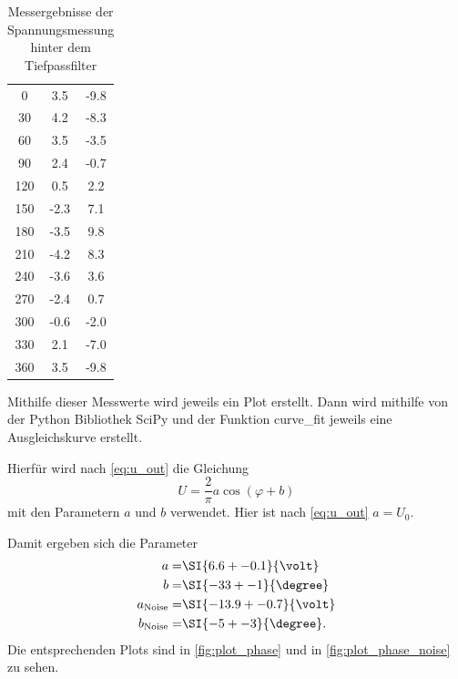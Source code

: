 \begin{table}
    \centering
    \begin{tabular}{S[table-format=3.0] S[table-format=-1.1] S[table-format=-1.1]}
        \toprule
        \tableSI{\varphi}{\degree} &  &  \\
         & 3.5 & -9.8 \\
        30 & 4.2 & -8.3 \\
        60 & 3.5 & -3.5 \\
        90 & 2.4 & -0.7 \\
        120 & 0.5 & 2.2 \\
        150 & -2.3 & 7.1 \\
        180 & -3.5 & 9.8 \\
        210 & -4.2 & 8.3 \\
        240 & -3.6 & 3.6 \\
        270 & -2.4 & 0.7 \\
        300 & -0.6 & -2.0 \\
        330 & 2.1 & -7.0 \\
        360 & 3.5 & -9.8 \\
        \bottomrule
    \end{tabular}
    \caption{Messergebnisse der Spannungsmessung hinter dem Tiefpassfilter}
    \label{tab:phase}
\end{table}

Mithilfe dieser Messwerte wird jeweils ein Plot erstellt.
Dann wird mithilfe von der Python Bibliothek SciPy und der Funktion curve\_fit jeweils eine Ausgleichskurve erstellt.\cite{scipy}

Hierfür wird nach \autoref{eq:u_out} die Gleichung
\begin{equation}
    U = \frac{2}{\pi}  a \cos(\varphi+b)
\end{equation}
mit den Parametern $a$ und $b$ verwendet.
Hier ist nach \autoref{eq:u_out} $a = U_0$.

Damit ergeben sich die Parameter
\begin{align*}
    a =& \SI{6.6+-0.1}{\volt} \\
    b =& \SI{-33+-1}{\degree} \\
    a_\text{Noise} =& \SI{-13.9+-0.7}{\volt} \\
    b_\text{Noise} =& \SI{-5+-3}{\degree}.
\end{align*}
Die entsprechenden Plots sind in \autoref{fig:plot_phase} und in \autoref{fig:plot_phase_noise} zu sehen.

